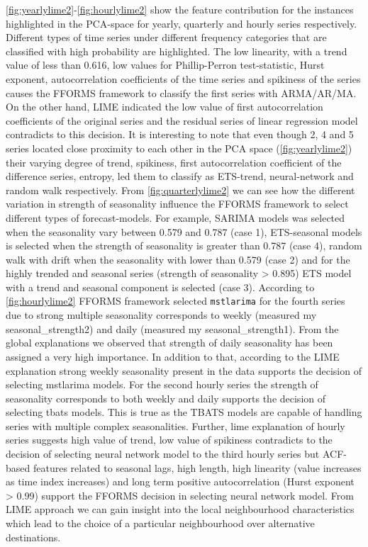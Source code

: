 \documentclass[11pt,a4paper,]{article}
\begin{document}
\autoref{fig:yearlylime2}-\autoref{fig:hourlylime2} show the feature
contribution for the instances highlighted in the PCA-space for yearly,
quarterly and hourly series respectively. Different types of time series
under different frequency categories that are classified with high
probability are highlighted. The low linearity, with a trend value of
less than 0.616, low values for Phillip-Perron test-statistic, Hurst
exponent, autocorrelation coefficients of the time series and spikiness
of the series causes the FFORMS framework to classify the first series
with ARMA/AR/MA. On the other hand, LIME indicated the low value of
first autocorrelation coefficients of the original series and the
residual series of linear regression model contradicts to this decision.
It is interesting to note that even though 2, 4 and 5 series located
close proximity to each other in the PCA space
(\autoref{fig:yearlylime2}) their varying degree of trend, spikiness,
first autocorrelation coefficient of the difference series, entropy, led
them to classify as ETS-trend, neural-network and random walk
respectively. From \autoref{fig:quarterlylime2} we can see how the
different variation in strength of seasonality influence the FFORMS
framework to select different types of forecast-models. For example,
SARIMA models was selected when the seasonality vary between 0.579 and
0.787 (case 1), ETS-seasonal models is selected when the strength of
seasonality is greater than 0.787 (case 4), random walk with drift when
the seasonality with lower than 0.579 (case 2) and for the highly
trended and seasonal series (strength of seasonality \textgreater{}
0.895) ETS model with a trend and seasonal component is selected (case
3). According to \autoref{fig:hourlylime2} FFORMS framework selected
\texttt{mstlarima} for the fourth series due to strong multiple
seasonality corresponds to weekly (measured my seasonal\_strength2) and
daily (measured my seasonal\_strength1). From the global explanations we
observed that strength of daily seasonality has been assigned a very
high importance. In addition to that, according to the LIME explanation
strong weekly seasonality present in the data supports the decision of
selecting mstlarima models. For the second hourly series the strength of
seasonality corresponds to both weekly and daily supports the decision
of selecting tbats models. This is true as the TBATS models are capable
of handling series with multiple complex seasonalities. Further, lime
explanation of hourly series suggests high value of trend, low value of
spikiness contradicts to the decision of selecting neural network model
to the third hourly series but ACF-based features related to seasonal
lags, high length, high linearity (value increases as time index
increases) and long term positive autocorrelation (Hurst exponent
\textgreater{} 0.99) support the FFORMS decision in selecting neural
network model. From LIME approach we can gain insight into the local
neighbourhood characteristics which lead to the choice of a particular
neighbourhood over alternative destinations.
\end{document}
